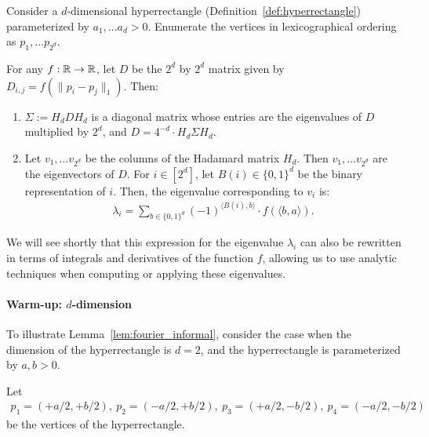 \begin{lemma} \label{lem:fourier_informal} 
Consider a $d$-dimensional hyperrectangle (Definition~\ref{def:hyperrectangle}) parameterized by $a_1, \ldots a_d > 0$. Enumerate the vertices in lexicographical ordering as $p_1, \ldots p_{2^d}$.
 
For any $f: {\mathbb R} \to {\mathbb R}$, let $D$ be the $2^d$ by $2^d$ matrix given by $D_{i,j} =f(\| p_i - p_j \|_1)$. Then:
 \begin{enumerate}
     \item $\Sigma := H_d D H_d$ is a diagonal matrix whose entries are the eigenvalues of $D$ multiplied by $2^d$, and $D = 4^{-d} \cdot H_d \Sigma H_d $.
     \item Let $v_1, \ldots v_{2^d}$ be the columns of the Hadamard matrix $H_d$. Then $v_1, \ldots v_{2^d}$ are the eigenvectors of $D$. For $i \in [2^d]$, let $B(i) \in \{0,1\}^d$ be the binary representation of $i$. Then, the eigenvalue corresponding to $v_i$ is: 
\begin{align}\label{eq:eigenvalue_formula}
\lambda_i = \sum_{b \in \{0,1\}^d} (-1)^{\langle B(i), b \rangle} \cdot f(\langle b, a \rangle). 
\end{align}
\end{enumerate}
\end{lemma}


We will see shortly that this expression for the eigenvalue $\lambda_i$ can also be rewritten in terms of integrals and derivatives of the function $f$, allowing us to use analytic techniques when computing or applying these eigenvalues.


\paragraph{Warm-up: $d$-dimension}  
To illustrate Lemma~\ref{lem:fourier_informal}, consider the case when the dimension of the hyperrectangle is $d=2$, and the hyperrectangle is parameterized by $a,b>0$. 

Let 
\begin{align*}
p_1 = (+a/2,+b/2), ~ 
p_2 = (-a/2,+b/2), ~ 
p_3 = (+a/2,-b/2), ~ 
p_4 = (-a/2,-b/2)
\end{align*}
be the vertices of the hyperrectangle. 

